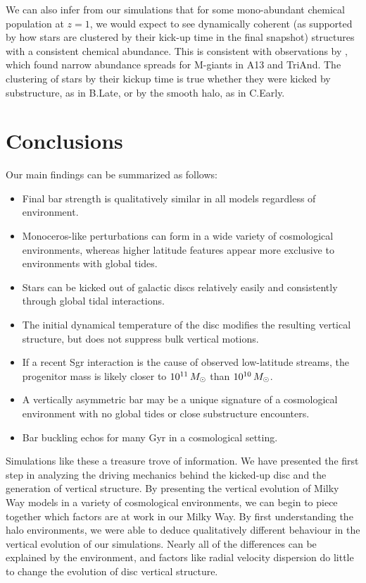 We can also infer from our simulations that for some mono-abundant chemical population at $z=1$, we would expect to see dynamically coherent (as supported by how stars are clustered by their kick-up time in the final snapshot) structures with a consistent chemical abundance. This is consistent with observations by \citet{bergemann_2018}, which found narrow abundance spreads for M-giants in A13 and TriAnd. The clustering of stars by their kickup time is true whether they were kicked by substructure, as in B.Late, or by the smooth halo, as in C.Early.



\section{Conclusions}

Our main findings can be summarized as follows:
\begin{itemize}
\item Final bar strength is qualitatively similar in all models regardless of environment.
\item Monoceros-like perturbations can form in a wide variety of cosmological environments, whereas higher latitude features appear more exclusive to environments with global tides.
\item Stars can be kicked out of galactic discs relatively easily and consistently through global tidal interactions.
\item The initial dynamical temperature of the disc modifies the resulting vertical structure, but does not suppress bulk vertical motions.
\item If a recent Sgr interaction is the cause of observed low-latitude streams, the progenitor mass is likely closer to $10^{11} \,M_\odot$ than $10^{10} \,M_\odot$.
\item A vertically asymmetric bar may be a unique signature of a cosmological environment with no global tides or close substructure encounters.
\item Bar buckling echos for many Gyr in a cosmological setting.
\end{itemize}

Simulations like these a treasure trove of information. We have presented the first step in analyzing the driving mechanics behind the kicked-up disc and the generation of vertical structure. By presenting the vertical evolution of Milky Way models in a variety of cosmological environments, we can begin to piece together which factors are at work in our Milky Way. By first understanding the halo environments, we were able to deduce qualitatively different behaviour in the vertical evolution of our simulations. Nearly all of the differences can be explained by the environment, and factors like radial velocity dispersion do little to change the evolution of disc vertical structure.

